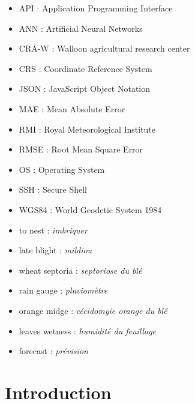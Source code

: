 \documentclass[12pt,twoside]{reedthesis}
\theoremstyle{definition}
\theoremstyle{definition}
\theoremstyle{definition}
\theoremstyle{remark}
\begin{document}
  \begin{abbreviations}
    \begin{itemize}
    \item
      API : Application Programming Interface
    \item
      ANN : Artificial Neural Networks
    \item
      CRA-W : Walloon agricultural research center
    \item
      CRS : Coordinate Reference System
    \item
      JSON : JavaScript Object Notation
    \item
      MAE : Mean Absolute Error
    \item
      RMI : Royal Meteorological Institute
    \item
      RMSE : Root Mean Square Error
    \item
      OS : Operating System
    \item
      SSH : Secure Shell
    \item
      WGS84 : World Geodetic System 1984
    \end{itemize}
  \end{abbreviations}
  \begin{definitions}
    \begin{itemize}
    \item
      to nest : \emph{imbriquer}
    \item
      late blight : \emph{mildiou}
    \item
      wheat septoria : \emph{septoriose du blé}
    \item
      rain gauge : \emph{pluviomètre}
    \item
      orange midge : \emph{cécidomyie orange du blé}
    \item
      leaves wetness : \emph{humidité du feuillage}
    \item
      forecast : \emph{prévision}
    \end{itemize}
  \end{definitions}
  \printindex

  \listoffigures

  \listoftables

  \hypersetup{linkcolor=black}
  \setcounter{tocdepth}{2}
  \tableofcontents

\mainmatter %
\pagestyle{fancyplain} %

\chapter*{Introduction}\label{introduction}
\end{document}
